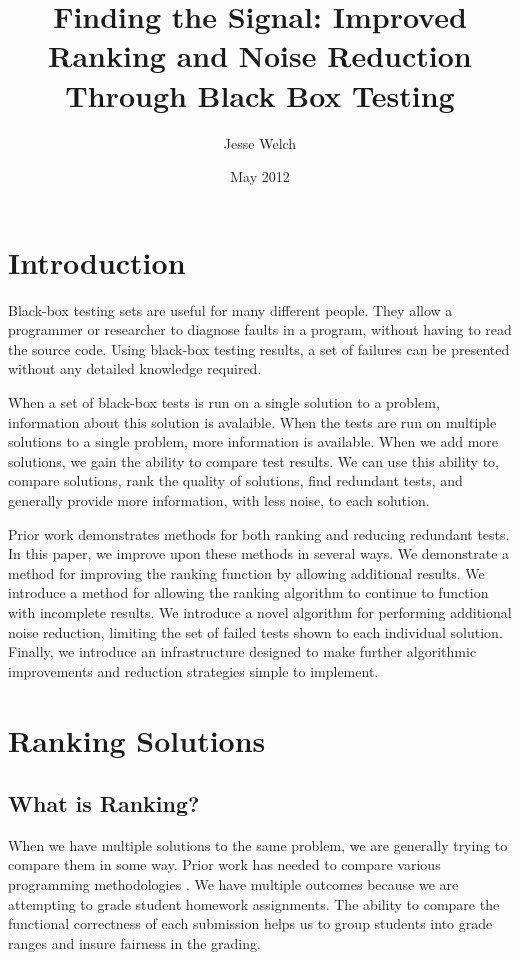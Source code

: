 \documentclass[11pt,twoside]{article}
\let\cite=\citep
\begin{document}
\title{Finding the Signal: Improved Ranking and Noise Reduction Through Black Box Testing}
\author{Jesse Welch}
\date{May 2012}

\pagestyle{headings}


\maketitle

\tableofcontents
\newpage

\baselineskip %


\section{Introduction}
Black-box testing sets are useful for many different people. They allow a programmer or researcher to diagnose faults in a program, without having to read the source code. Using black-box testing results, a set of failures can be presented without any detailed knowledge required.

When a set of black-box tests is run on a single solution to a problem, information about this solution is avalaible. When the tests are run on multiple solutions to a single problem, more information is available. When we add more solutions, we gain the ability to compare test results. We can use this ability to, compare solutions, rank the quality of solutions, find redundant tests, and generally provide more information, with less noise, to each solution.

Prior work demonstrates methods for both ranking and reducing redundant tests. In this paper, we improve upon these methods in several ways. We demonstrate a method for improving the ranking function by allowing additional results. We introduce a method for allowing the ranking algorithm to continue to function with incomplete results. We introduce a novel algorithm for performing additional noise reduction, limiting the set of failed tests shown to each individual solution. Finally, we introduce an infrastructure designed to make further algorithmic improvements and reduction strategies simple to implement.

\section{Ranking Solutions}
\subsection{What is Ranking?}
When we have multiple solutions to the same problem, we are generally trying to compare them in some way. Prior work has needed to compare various programming methodologies \cite{Claessen}. We have multiple outcomes because we are attempting to grade student homework assignments. The ability to compare the functional correctness of each submission helps us to group students into grade ranges and insure fairness in the grading.
\end{document}
